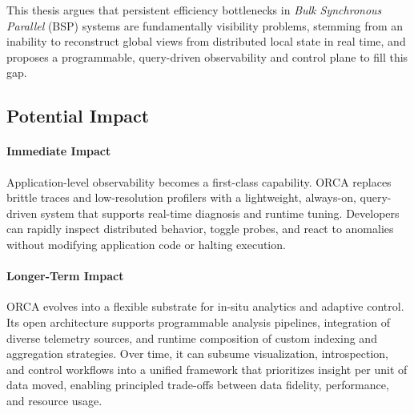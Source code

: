\begin{tcolorbox}[thesisbox]
  This thesis argues that persistent efficiency bottlenecks in \emph{Bulk Synchronous Parallel}
  (BSP) systems are fundamentally visibility problems, stemming from an inability to reconstruct global
  views from distributed local state in real time, and proposes a programmable, query-driven
  observability and control plane to fill this gap.
\end{tcolorbox}

\subsection{Potential Impact}

\paragraph{Immediate Impact}
Application-level observability becomes a first-class capability.
ORCA replaces brittle traces and low-resolution profilers with a lightweight, always-on,
query-driven system that supports real-time diagnosis and runtime tuning.
Developers can rapidly inspect distributed behavior, toggle probes, and react to anomalies without
modifying application code or halting execution.

\paragraph{Longer-Term Impact}
ORCA evolves into a flexible substrate for in-situ analytics and adaptive control.
Its open architecture supports programmable analysis pipelines, integration of diverse telemetry
sources, and runtime composition of custom indexing and aggregation strategies.
Over time, it can subsume visualization, introspection, and control workflows into a unified
framework that prioritizes insight per unit of data moved, enabling principled trade-offs between
data fidelity, performance, and resource usage.

